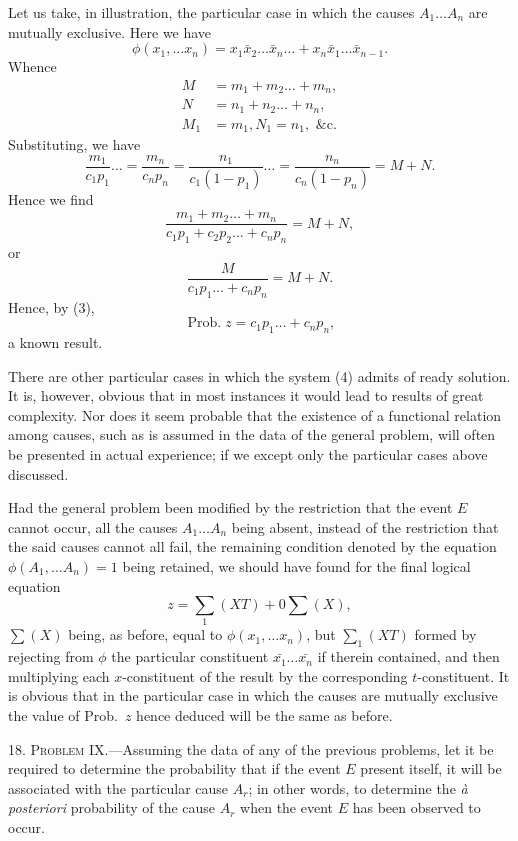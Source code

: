 \documentclass[oneside]{book}
\begin{document}
Let us take, in illustration, the particular case in which the
causes $A_1 \dotsc A_n$ are mutually exclusive. Here we have
\begin{equation*}
\phi(x_1, \dotsc x_n) = x_1 \bar{x}_2 \dotsc \bar{x}_n \dotsc
+ x_n \bar{x}_1 \dotsc \bar{x}_{n-1}.
\end{equation*}
Whence
\begin{align*}
M &= m_1 + m_2 \dotsc + m_n,\\
N &= n_1 + n_2 \dotsc + n_n,\\
M_1 &= m_1, N_1 = n_1, \text{ \&c.}
\end{align*}
Substituting, we have
\[
\frac{m_1}{c_1 p_1} \dotso = \frac{m_n}{c_n p_n}
= \frac{n_1}{c_1 (1-p_1)} \dotso
= \frac{n_n}{c_n (1-p_n)} = M + N.
\]
Hence we find
\[
\frac{m_1 + m_2 \dotsc + m_n}
     {c_1 p_1 + c_2 p_2 \dotsc + c_n p_n}
= M + N,
\]
or
\[
\frac{M}{c_1 p_1 \dotsc + c_n p_n} = M + N.
\]
Hence, by (3),
\[
\operatorname{Prob. } z = c_1 p_1 \dotsc + c_n p_n,
\]
a known result.

There are other particular cases in which the system (4) admits
of ready solution. It is, however, obvious that in most
instances it would lead to results of great complexity. Nor does
it seem probable that the existence of a functional relation among
causes, such as is assumed in the data of the general problem, will
often be presented in actual experience; if we except only the
particular cases above discussed.

Had the general problem been modified by the restriction
that the event $E$ cannot occur, all the causes $A_1 \dotsc A_n$ being absent,
instead of the restriction that the said causes cannot all fail,
the remaining condition denoted by the equation $\phi(A_1,\dotsc A_n) = 1$
being retained, we should have found for the final logical equation
\[
z = \sum_1(XT) + 0 \sum(X),
\]
$\sum(X)$ being, as before, equal to $\phi(x_1,\dotsc x_n)$, but $\sum_1(XT)$ formed
by rejecting from $\phi$ the particular constituent
$\bar{x_1}\dotsc\bar{x_n}$ if therein
contained, and then multiplying each $x$-constituent of the result
by the corresponding $t$-constituent. It is obvious that in the particular
case in which the causes are mutually exclusive the value
of Prob.~$z$ hence deduced will be the same as before.

18. \textsc{Problem} IX.---Assuming the data of any of the
previous problems, let it be required to determine the probability
that if the event $E$ present itself, it will be associated with the
particular cause $A_r$; in other words, to determine the
\textit{\`{a} posteriori}
probability of the cause $A_r$ when the event $E$ has been observed
to occur.
\end{document}
